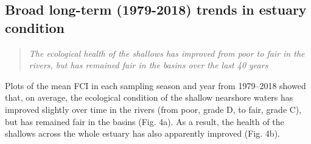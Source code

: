\documentclass[
]{book}
\begin{document}
\hypertarget{broad-long-term-1979-2018-trends-in-estuary-condition}{%
\subsection{Broad long-term (1979-2018) trends in estuary condition}\label{broad-long-term-1979-2018-trends-in-estuary-condition}}

\begin{quote}
\emph{The ecological health of the shallows has improved from poor to fair in the rivers, but has remained fair in the basins over the last 40 years}
\end{quote}

Plots of the mean FCI in each sampling season and year from 1979--2018 showed that, on average, the ecological condition of the shallow nearshore waters has improved slightly over time in the rivers (from poor, grade D, to fair, grade C), but has remained fair in the basins (Fig. 4a). As a result, the health of the shallows across the whole estuary has also apparently improved (Fig. 4b).~
\end{document}
